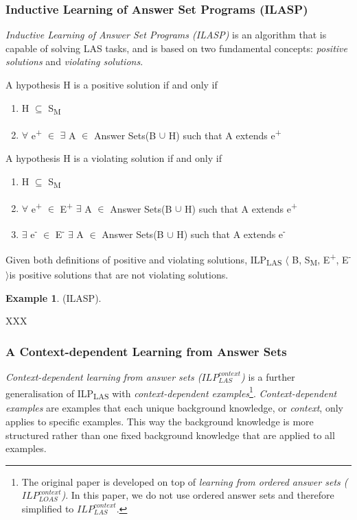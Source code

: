 \documentclass[12pt,twoside]{report}
\theoremstyle{plain}
\theoremstyle{definition}
\newtheorem{examp}{Example}[section]
\begin{document}

\subsubsection{Inductive Learning of Answer Set Programs (ILASP)}

\textit{Inductive Learning of Answer Set Programs (ILASP)} is an algorithm that is capable of solving LAS tasks, and is based on two fundamental concepts: \textit{positive solutions} and \textit{violating solutions}.

A hypothesis H is a positive solution if and only if
\begin{enumerate}
\item H $\subseteq$ S\textsubscript{M}
\item $\forall$ e\textsuperscript{+} $\in$ $\exists$ A $\in$ Answer Sets(B $\cup$ H) such that A extends e\textsuperscript{+}
\end{enumerate}
A hypothesis H is a violating solution if and only if
\begin{enumerate}
\item H $\subseteq$ S\textsubscript{M}
\item $\forall$ e\textsuperscript{+} $\in$ E\textsuperscript{+} $\exists$ A $\in$ Answer Sets(B $\cup$ H) such that A extends e\textsuperscript{+}
\item $\exists$ e\textsuperscript{-} $\in$ E\textsuperscript{-} $\exists$ A $\in$ Answer Sets(B $\cup$ H) such that A extends e\textsuperscript{-}\\
\end{enumerate}

Given both definitions of positive and violating solutions, ILP\textsubscript{LAS} $\langle$ B, S\textsubscript{M}, E\textsuperscript{+}, E\textsuperscript{-} $\rangle$is positive solutions that are not violating solutions.

\begin{examp} \normalfont (ILASP).

XXX
\end{examp}

\subsubsection{A Context-dependent Learning from Answer Sets }
\textit{Context-dependent learning from answer sets ($ILP_{LAS}^{context}$)} is a further generalisation of ILP\textsubscript{LAS} with \textit{context-dependent examples}\cite{Law2016}\footnote{The original paper is developed on top of \textit{learning from ordered answer sets ($ILP_{LOAS}^{context}$)}. In this paper, we do not use ordered answer sets and therefore simplified to $ILP_{LAS}^{context}$. }.
\textit{Context-dependent examples} are examples that each unique background knowledge, or \textit{context}, only applies to specific examples. This way the background knowledge is more structured rather than one fixed background knowledge that are applied to all examples.
\end{document}
